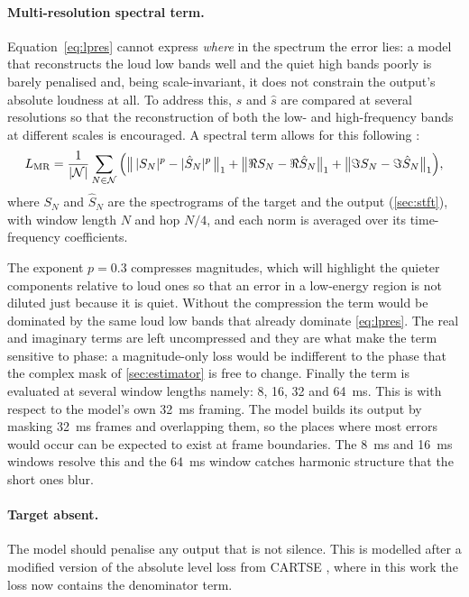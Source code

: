 \paragraph{Multi-resolution spectral term.}
Equation~\eqref{eq:lpres} cannot express \emph{where} in the spectrum the error lies: a model that reconstructs the loud low bands well and the quiet high bands poorly is barely penalised and, being scale-invariant, it does not constrain the output's absolute loudness at all. To address this, $s$ and $\hat{s}$ are compared at several resolutions so that the reconstruction of both the low- and high-frequency bands at different scales is encouraged. A spectral term allows for this following \cite{yu2023high}:
\begin{equation}
L_\textup{MR} = \frac{1}{|\mathcal{N}|} \sum_{N \in \mathcal{N}}
  \Big(
    \big\lVert\, |S_N|^{p} - |\hat{S}_N|^{p} \,\big\rVert_1
    + \big\lVert \Re S_N - \Re \hat{S}_N \big\rVert_1
    + \big\lVert \Im S_N - \Im \hat{S}_N \big\rVert_1
  \Big),
\label{eq:lmr}
\end{equation}
where $S_N$ and $\hat{S}_N$ are the spectrograms of the target and the output (\autoref{sec:stft}), with window length $N$ and hop $N/4$, and each norm is averaged over its time-frequency coefficients.

 The exponent $p = 0.3$ compresses magnitudes, which will highlight the quieter components relative to loud ones so that an error in a low-energy region is not diluted just because it is quiet. Without the compression the term would be dominated by the same loud low bands that already dominate \eqref{eq:lpres}. The real and imaginary terms are left uncompressed and they are what make the term sensitive to phase: a magnitude-only loss would be indifferent to the phase that the complex mask of \autoref{sec:estimator} is free to change. Finally the term is evaluated at several window lengths namely: \num{8}, \num{16}, \num{32} and \SI{64}{\ms}. This is with respect to the model's own \SI{32}{\ms} framing. The model builds its output by masking \SI{32}{\ms} frames and overlapping them, so the places where most errors would occur can be expected to exist at frame boundaries. The \SI{8}{\ms} and \SI{16}{\ms} windows resolve this and the \SI{64}{\ms} window catches harmonic structure that the short ones blur.

\paragraph{Target absent.}
The model should penalise any output that is not silence. This is modelled after a modified version of the absolute level loss from CARTSE \cite{li2026cartse}, where in this work the loss now contains the denominator term. 

